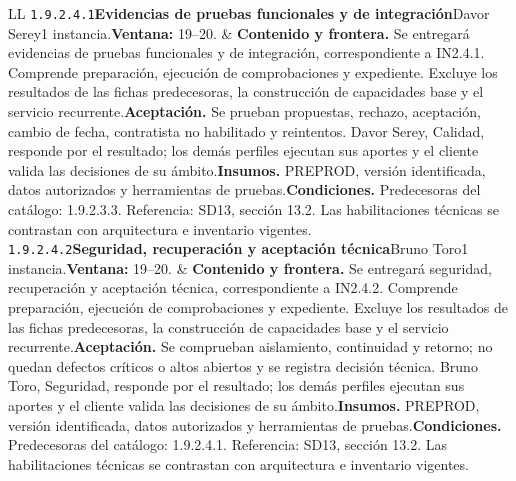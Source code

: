 \begin{longtable}{L{\tabcolsep\relax}L{\tabcolsep\relax}}
\texttt{1.\allowbreak{}9.\allowbreak{}2.\allowbreak{}4.\allowbreak{}1}\newline{}\textbf{Evidencias de pruebas funcionales y de integración}\newline{}Davor Serey\newline{}1 instancia.\newline{}\textbf{Ventana:} 19--20. & \textbf{Contenido y frontera.} Se entregará evidencias de pruebas funcionales y de integración, correspondiente a IN2.4.1. Comprende preparación, ejecución de comprobaciones y expediente. Excluye los resultados de las fichas predecesoras, la construcción de capacidades base y el servicio recurrente.\newline{}\textbf{Aceptación.} Se prueban propuestas, rechazo, aceptación, cambio de fecha, contratista no habilitado y reintentos. Davor Serey, Calidad, responde por el resultado; los demás perfiles ejecutan sus aportes y el cliente valida las decisiones de su ámbito.\newline{}\textbf{Insumos.} PREPROD, versión identificada, datos autorizados y herramientas de pruebas.\newline{}\textbf{Condiciones.} Predecesoras del catálogo: 1.9.2.3.3. Referencia: SD13, sección 13.2. Las habilitaciones técnicas se contrastan con arquitectura e inventario vigentes.\\\hline
\texttt{1.\allowbreak{}9.\allowbreak{}2.\allowbreak{}4.\allowbreak{}2}\newline{}\textbf{Seguridad, recuperación y aceptación técnica}\newline{}Bruno Toro\newline{}1 instancia.\newline{}\textbf{Ventana:} 19--20. & \textbf{Contenido y frontera.} Se entregará seguridad, recuperación y aceptación técnica, correspondiente a IN2.4.2. Comprende preparación, ejecución de comprobaciones y expediente. Excluye los resultados de las fichas predecesoras, la construcción de capacidades base y el servicio recurrente.\newline{}\textbf{Aceptación.} Se comprueban aislamiento, continuidad y retorno; no quedan defectos críticos o altos abiertos y se registra decisión técnica. Bruno Toro, Seguridad, responde por el resultado; los demás perfiles ejecutan sus aportes y el cliente valida las decisiones de su ámbito.\newline{}\textbf{Insumos.} PREPROD, versión identificada, datos autorizados y herramientas de pruebas.\newline{}\textbf{Condiciones.} Predecesoras del catálogo: 1.9.2.4.1. Referencia: SD13, sección 13.2. Las habilitaciones técnicas se contrastan con arquitectura e inventario vigentes.\\\hline

\end{longtable}
